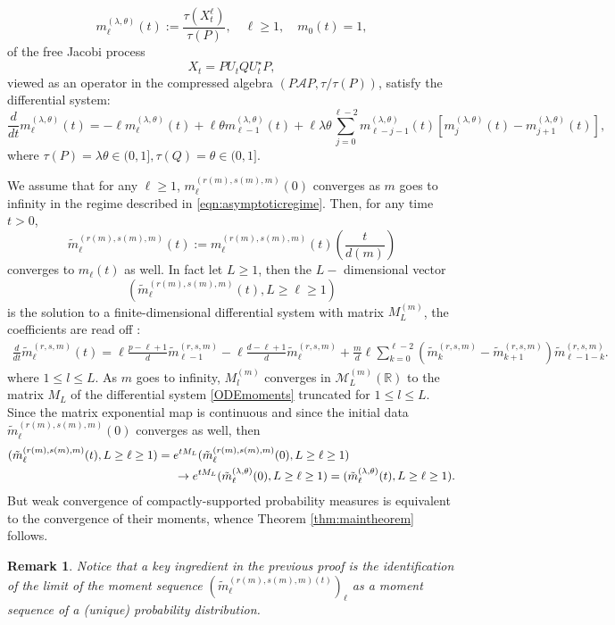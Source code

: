 \documentclass[12pt,reqno]{amsart}
\newtheorem{remark}{Remark}
\begin{document}
\begin{equation*}
	m^{(\lambda,\theta)}_{\ell}(t) := \frac{\tau(X_t^{\ell})}{\tau(P)}, \quad \ell \geq 1, \quad m_0(t) = 1,
\end{equation*}
of the free Jacobi process 
\begin{equation*}
	X_t = PU_tQU_t^{\star}P,
\end{equation*}
viewed as an operator in the compressed algebra $(P\mathscr{A}P, \tau/\tau(P))$, satisfy the differential system:
\begin{equation}\label{Jacmoments}
	\frac{d}{dt} m^{(\lambda,\theta)}_{\ell}(t) = -\ell m^{(\lambda,\theta)}_{\ell}(t) + \ell \theta m^{(\lambda,\theta)}_{\ell-1}(t) + \ell \lambda \theta \sum_{j=0}^{\ell-2}m^{(\lambda,\theta)}_{\ell-j-1}(t) [m^{(\lambda,\theta)}_{j}(t) - m^{(\lambda,\theta)}_{j+1}(t)],
\end{equation}
where $\tau(P) = \lambda \theta \in (0,1], \tau(Q) = \theta \in (0,1]$. 

We assume that for any $\ell \geq 1$, $m_{\ell}^{(r(m),s(m),m)}(0)$ converges as $m$ goes to infinity in the regime described in \eqref{eqn:asymptoticregime}. Then, for any time $t > 0$, 
 $$ 
 \tilde{m}_{\ell}^{(r(m),s(m),m)}(t):=m_{\ell}^{(r(m),s(m),m)}(t)\left(\frac{t}{d(m)}\right)
 $$ 
 converges to $m_{\ell}(t)$ as well. In fact let $L \geq 1$, then the $L-$ dimensional vector 
 $$(\tilde{m}_{\ell}^{(r(m),s(m),m)}(t), L\geq \ell \geq 1)$$ is the solution to a finite-dimensional differential system with matrix $M^{(m)}_L$, the coefficients are read off :
\begin{multline*}
	\frac{d}{dt}\tilde{m}_{\ell}^{(r,s,m)} (t)=\ell\frac{p-\ell+1}{d}  \tilde{m}_{\ell-1}^{(r,s,m)}-\ell\frac{d-\ell+1}{d} \tilde{m}_{\ell}^{(r,s,m)}
	+ \frac{m}{d}\ell\sum_{k=0}^{\ell-2}(\tilde{m}_{k}^{(r,s,m)}-\tilde{m}_{k+1}^{(r,s,m)})\tilde{m}_{\ell-1-k}^{(r,s,m)}.
\end{multline*}
where $ 1 \leq l \leq L$. As $m$ goes to infinity, $M^{(m)}_l$ converges in $\mathcal{M}_{L}^{(m)}(\mathbb{R})$ to the matrix $M_L$ of the differential system \eqref{ODEmoments} truncated for $1 \leq l \leq L$. Since the matrix exponential map is continuous and since the initial data $\tilde{m}_{\ell}^{(r(m),s(m),m)}(0)$ converges as well, then 
\begin{align*}
(\tilde{m}_{\ell}^{(r(m),s(m),m)}(t), L\geq \ell \geq 1) &= e^{tM_L}(\tilde{m}_{\ell}^{(r(m),s(m),m)}(0), L\geq \ell \geq 1) \\ 
&\hspace{0.5cm}\rightarrow e^{tM_L}(\tilde{m}_{\ell}^{(\lambda,\theta)}(0), L\geq \ell \geq 1) = (\tilde{m}_{\ell}^{(\lambda,\theta)}(t), L\geq \ell \geq 1).
\end{align*}
But weak convergence of compactly-supported probability measures is equivalent to the convergence of their moments, whence Theorem \ref{thm:maintheorem} follows. 
\begin{remark}
Notice that a key ingredient in the previous proof is the identification of the limit of the moment sequence $(\tilde{m}_{\ell}^{(r(m),s(m),m)(t)})_{\ell}$ as a moment sequence of a (unique) probability distribution.  \end{remark}
\end{document}
